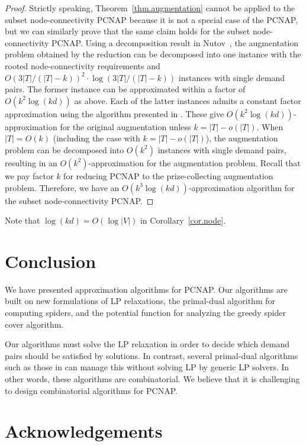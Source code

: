 \documentclass[11pt]{article}
\begin{document}
\begin{proof}
 Strictly speaking,
 Theorem~\ref{thm.augmentation} cannot be applied to the subset
 node-connectivity PCNAP because it is not a special case of the PCNAP, 
 but we can similarly prove that the same claim holds for
 the subset node-connectivity PCNAP.
  Using a decomposition result in Nutov~\cite{Nutov12subset},
 the augmentation problem obtained by the reduction 
 can be decomposed into
 one instance with the rooted node-connectivity requirements and $O(3|T|/(|T|-k))^2
 \cdot \log(3|T|/(|T|-k))$ instances  with single demand pairs.
 The former instance can be approximated within a factor of $O(k^2 \log
 (kd))$
 as above.
 Each of the latter instances admits a constant factor approximation
 using the algorithm presented in \cite{Nutov13activation}.
 These give $O(k^2 \log (kd))$-approximation for the original augmentation unless $k=|T|-o(|T|)$. 
 When $|T|=O(k)$ (including the case with $k=|T|-o(|T|)$), 
 the augmentation problem can be decomposed into $O(k^2)$ instances
 with single demand pairs, resulting in an $O(k^2)$-approximation for
 the augmentation problem.
 Recall that we pay factor $k$ for reducing PCNAP to the
 prize-collecting augmentation problem.
 Therefore, we have an $O(k^3 \log (kd))$-approximation algorithm for the
 subset node-connectivity PCNAP.
\end{proof}

Note that $\log (kd)=O(\log|V|)$ in Corollary~\ref{cor.node}.

\section{Conclusion}\label{sec.conclusion}

We have presented approximation algorithms for PCNAP.
Our algorithms are built on new formulations of LP relaxations, the primal-dual algorithm for computing spiders, and the potential
function for analyzing the greedy spider cover algorithm.

Our algorithms must solve the LP relaxation in order to decide which demand
pairs should be satisfied by solutions. In contrast, several primal-dual algorithms such as
those in \cite{BateniHL13,Konemann13CoRR} can manage this without solving LP
by generic LP solvers.
In other words, these algorithms are combinatorial.
We believe that it is challenging to design combinatorial algorithms for PCNAP.


\section*{Acknowledgements}
\end{document}
